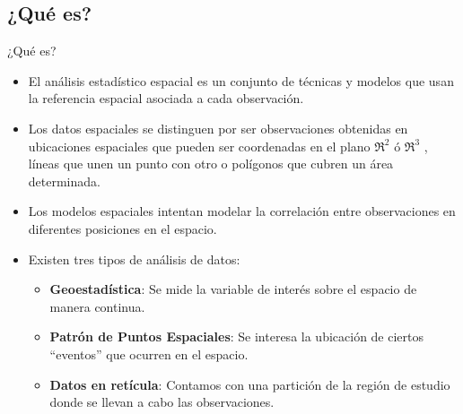 \documentclass{beamer}
\begin{document}
\subsection{¿Qué es?}

\begin{frame}{¿Qué es?}
  \begin{itemize}
  \item El análisis estadístico espacial es un conjunto de técnicas y modelos que usan la referencia espacial asociada a cada observación.
  \item Los datos espaciales se distinguen por ser observaciones obtenidas en ubicaciones espaciales que pueden ser coordenadas en el plano $\Re^2$ ó $\Re^3$ , líneas que unen un punto con otro o polígonos que cubren un área determinada.
  \item Los modelos espaciales intentan modelar la correlación entre observaciones en diferentes posiciones en el espacio.
  \item Existen tres tipos de análisis de datos:
  \begin{itemize}
  \item \textbf{Geoestadística}: Se mide la variable de interés sobre el espacio de manera continua.
  \item \textbf{Patrón de Puntos Espaciales}: Se interesa la ubicación de ciertos ``eventos'' que ocurren en el espacio.
  \item \textbf{Datos en retícula}: Contamos con una partición de la región de estudio donde se llevan a cabo las observaciones. 
  \end{itemize}
  \end{itemize}
\end{frame}
\end{document}
